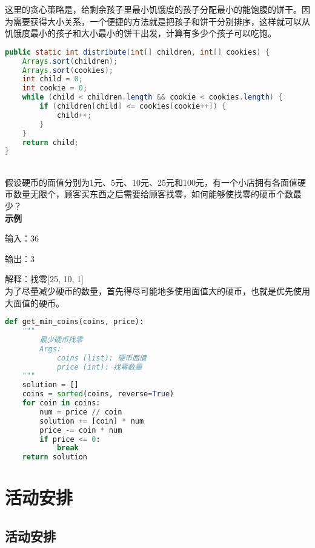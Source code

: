 这里的贪心策略是，给剩余孩子里最小饥饿度的孩子分配最小的能饱腹的饼干。因为需要获得大小关系，一个便捷的方法就是把孩子和饼干分别排序，这样就可以从饥饿度最小的孩子和大小最小的饼干出发，计算有多少个孩子可以吃饱。

\vspace{-0.5cm}

\begin{lstlisting}[language=Java]
public static int distribute(int[] children, int[] cookies) {
    Arrays.sort(children);
    Arrays.sort(cookies);
    int child = 0;
    int cookie = 0;
    while (child < children.length && cookie < cookies.length) {
        if (children[child] <= cookies[cookie++]) {
            child++;
        }
    }
    return child;
}
\end{lstlisting}

\vspace{0.5cm}

\\

假设硬币的面值分别为1元、5元、10元、25元和100元，有一个小店拥有各面值硬币数量无限个，顾客买东西之后需要给顾客找零，如何能够使找零的硬币个数最少？\\

\textbf{示例}

输入：36

输出：3

解释：找零[25, 10, 1]\\

为了尽量减少硬币的数量，首先得尽可能地多使用面值大的硬币，也就是优先使用大面值的硬币。

\vspace{-0.5cm}

\begin{lstlisting}[language=Python]
def get_min_coins(coins, price):
    """
        最少硬币找零
        Args:
            coins (list): 硬币面值
            price (int): 找零数量
    """
    solution = []
    coins = sorted(coins, reverse=True)
    for coin in coins:
        num = price // coin
        solution += [coin] * num
        price -= coin * num
        if price <= 0:
            break
    return solution
\end{lstlisting}

\newpage

\section{活动安排}

\subsection{活动安排}

